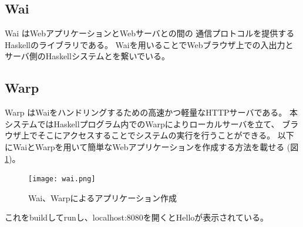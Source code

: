 \documentclass{csspaper}
\begin{document}
      \subsection{Wai}
      Wai \cite{10}はWebアプリケーションとWebサーバとの間の
      通信プロトコルを提供するHaskellのライブラリである。
      Waiを用いることでWebブラウザ上での入出力と
      サーバ側のHaskellシステムとを繋いでいる。

      \subsection{Warp}
      Warp \cite{11}はWaiをハンドリングするための高速かつ軽量なHTTPサーバである。
      本システムではHaskellプログラム内でのWarpによりローカルサーバを立て、
      ブラウザ上でそこにアクセスすることでシステムの実行を行うことができる。
      以下にWaiとWarpを用いて簡単なWebアプリケーションを作成する方法を載せる (図\ref{fig:warp})。

      \begin{figure}[h]
         \texttt{[image: wai.png]}
         \caption{Wai、Warpによるアプリケーション作成}
         \label{fig:warp}
      \end{figure}

      これをbuildしてrunし、localhost:8080を開くとHelloが表示されている。

\end{document}
